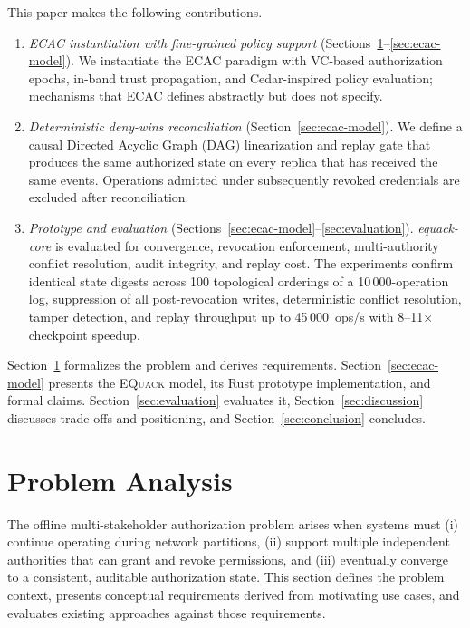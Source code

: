 \documentclass[10pt,journal,compsoc]{IEEEtran}
\newcommand{\equack}{\textsc{EQuack}}
\begin{document}
  This paper makes the following contributions.
\begin{enumerate}
    \item \textit{ECAC instantiation with fine-grained policy
      support} (Sections~\ref{sec:problem-analysis}--\ref{sec:ecac-model}).
      We instantiate the ECAC paradigm
      with VC-based authorization epochs, in-band trust propagation,
      and Cedar-inspired policy evaluation; mechanisms that ECAC
      defines abstractly but does not specify.

    \item \textit{Deterministic deny-wins reconciliation}
      (Section~\ref{sec:ecac-model}).  We define a causal Directed Acyclic Graph (DAG)
      linearization and replay gate that produces the same authorized
      state on every replica that has received the same events.
      Operations admitted under subsequently revoked credentials are
      excluded after reconciliation.

    \item \textit{Prototype and evaluation}
      (Sections~\ref{sec:ecac-model}--\ref{sec:evaluation}).  \textit{equack-core} is evaluated for convergence, revocation
      enforcement, multi-authority conflict resolution, audit integrity,
      and replay cost.  The experiments confirm identical state digests
      across 100 topological orderings of a 10\,000-operation log,
      suppression of all post-revocation writes, deterministic conflict
      resolution, tamper detection, and replay throughput up to
      45\,000~ops/s with 8--11$\times$ checkpoint speedup.
\end{enumerate}

  Section~\ref{sec:problem-analysis} formalizes the problem and derives requirements.
  Section~\ref{sec:ecac-model} presents the \equack{} model, its Rust prototype
  implementation, and formal claims.
  Section~\ref{sec:evaluation} evaluates it,
  Section~\ref{sec:discussion} discusses trade-offs and positioning, and Section~\ref{sec:conclusion} concludes.

\section{Problem Analysis}\label{sec:problem-analysis}

The offline multi-stakeholder authorization problem arises when systems must (i) continue operating during network partitions, (ii) support multiple independent authorities that can grant and revoke permissions, and (iii) eventually converge to a consistent, auditable authorization state. This section defines the problem context, presents conceptual requirements derived from motivating use cases, and evaluates existing approaches against those requirements.
\end{document}
